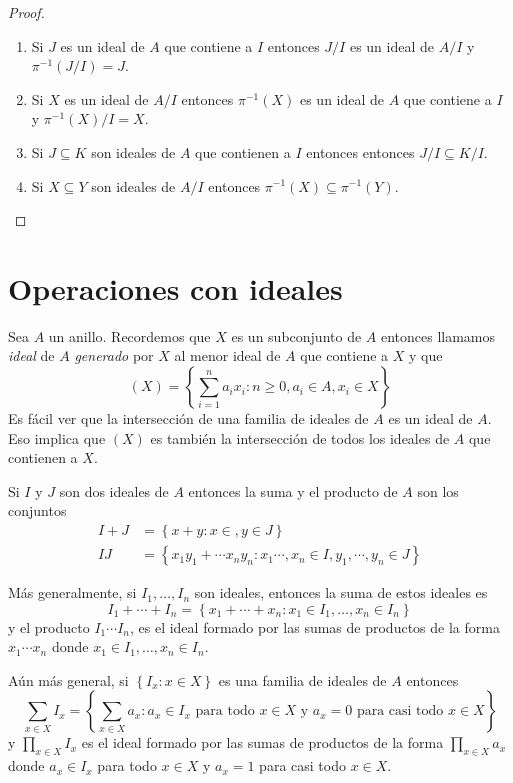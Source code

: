 \begin{proof} \
    \begin{enumerate}[label=(\arabic*)]
        \item Si $J$ es un ideal de $A$ que contiene a $I$ entonces $J/I$ es un ideal de $A/I$ y $\pi^{-1}(J/I)=J$.
        \item Si $X$ es un ideal de $A/I$ entonces $\pi^{-1}(X)$ es un ideal de $A$ que contiene a $I$ y $\pi^{-1}(X)/I=X$.
        \item Si $J\subseteq K$ son ideales de $A$ que contienen a $I$ entonces entonces $J/I\subseteq K/I$.
        \item Si $X\subseteq Y$ son ideales de $A/I$ entonces $\pi^{-1}(X)\subseteq\pi^{-1}(Y)$.
    \end{enumerate}
\end{proof}

\section{Operaciones con ideales}

Sea $A$ un anillo. Recordemos que $X$ es un subconjunto de $A$ entonces llamamos {\it ideal} de $A$ {\it generado} por $X$ al menor ideal de $A$ que contiene a $X$ y que 
$$(X) =\left\lbrace \sum_{i=1}^na_ix_i : n\geq 0, a_i\in A, x_i\in X \right\rbrace$$
Es fácil ver que la intersección de una familia de ideales de $A$ es un ideal de $A$. Eso implica que $(X)$ es también la intersección de todos los ideales de $A$ que contienen a $X$.

Si $I$ y $J$ son dos ideales de $A$ entonces la suma y el producto de $A$ son los conjuntos
\begin{equation*}
    \begin{split}
        I + J &= \left\lbrace x+y : x\in, y\in J \right\rbrace \\
        IJ    &= \left\lbrace x_1y_1 + \cdots x_ny_n : x_1\cdots,x_n\in I, y_1,\cdots,y_n\in J \right\rbrace
    \end{split}
\end{equation*}

Más generalmente, si $I_1,\dots,I_n$ son ideales, entonces la suma de estos ideales es
$$I_1+\cdots +I_n=\left\lbrace x_1+\cdots+x_n: x_1\in I_1,\dots, x_n\in I_n\right\rbrace$$
y el producto $I_1\cdots I_n$, es el ideal formado por las sumas de productos de la forma $x_1\cdots x_n$ donde $x_1\in I_1,\dots,x_n\in I_n$.

Aún más general, si $\left\lbrace I_x : x\in X\right\rbrace$ es una familia de ideales de $A$ entonces
$$\sum_{x\in X}I_x=\left\lbrace \sum_{x\in X}a_x : a_x \in I_x\text{ para todo }x\in X\text{ y }a_x=0\text{ para casi todo }x\in X\right\rbrace$$
y $\prod_{x\in X}I_x$ es el ideal formado por las sumas de productos de la forma $\prod_{x\in X}a_x$ donde $a_x\in I_x$ para todo $x\in X$ y $a_x=1$ para casi todo $x\in X$.

